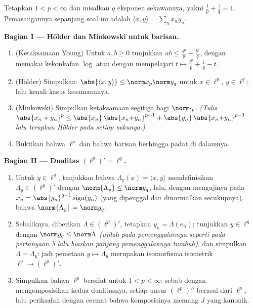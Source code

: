 \begin{problem}[{Soal akhir pekan --- $(\ell^p)' = \ell^q$,
kerefleksifan, dan keanehan $\ell^\infty$}]
\label{pb:b3:banach:1}
Tetapkan $1 < p < \infty$ dan misalkan $q$ eksponen sekawannya, yakni
$\frac1p + \frac1q = 1$. Pemasangannya sepanjang soal ini adalah $\langle x,
y\rangle = \sum_n x_ny_n$.

\medskip
\noindent\textbf{Bagian I --- Hölder dan Minkowski untuk
barisan.}
\begin{enumerate}
  \item (Ketaksamaan Young) Untuk $a, b \geq 0$ tunjukkan $ab \leq
        \frac{a^p}p + \frac{b^q}q$, dengan memakai kekonkafan $\log$ atau
        dengan mempelajari $t \mapsto \frac{t^p}p + \frac1q - t$.
  \item (Hölder) Simpulkan: $\abs{\langle x, y\rangle} \leq
        \norm x_p\norm y_q$ untuk $x \in \ell^p$, $y \in \ell^q$;
        lalu kenali kasus kesamaannya.
  \item (Minkowski) Simpulkan ketaksamaan segitiga bagi
        $\norm\cdot_p$. \emph{(Tulis $\abs{x_n + y_n}^p \leq
        \abs{x_n}\,\abs{x_n{+}y_n}^{p-1} +
        \abs{y_n}\,\abs{x_n{+}y_n}^{p-1}$ lalu terapkan Hölder pada
        setiap sukunya.)}
  \item Buktikan bahwa $\ell^p$  dan bahwa barisan
        berhingga padat di dalamnya.
\end{enumerate}

\medskip
\noindent\textbf{Bagian II --- Dualitas $(\ell^p)' =
\ell^q$.}
\begin{enumerate}[resume]
  \item Untuk $y \in \ell^q$, tunjukkan bahwa $\Lambda_y(x) = \langle
        x, y\rangle$ mendefinisikan $\Lambda_y \in (\ell^p)'$ dengan
        $\norm{\Lambda_y} \leq \norm y_q$, lalu, dengan mengujinya pada
        $x_n = \abs{y_n}^{q-1}\operatorname{sign}(y_n)$
        (yang dipenggal dan dinormalkan secukupnya), bahwa
        $\norm{\Lambda_y} = \norm y_q$.
  \item Sebaliknya, diberikan $\Lambda \in (\ell^p)'$, tetapkan $y_n =
        \Lambda(e_n)$; tunjukkan $y \in \ell^q$ dengan $\norm y_q \leq
        \norm\Lambda$ \emph{(ujilah pada pemenggalannya seperti pada pertanyaan
        5 lalu biarkan panjang pemenggalannya tumbuh)}, dan simpulkan
        $\Lambda = \Lambda_y$: jadi pemetaan $y \mapsto \Lambda_y$ merupakan
        isomorfisma isometrik $\ell^q \to (\ell^p)'$.
  \item Simpulkan bahwa $\ell^p$ bersifat \emph{} untuk $1 < p <
        \infty$: sebab dengan mengomposisikan kedua dualitasnya, setiap unsur
        $(\ell^p)''$ berasal dari $\ell^p$; lalu periksalah dengan cermat bahwa
        komposisinya memang $J$ yang kanonik.
\end{enumerate}


\end{problem}

